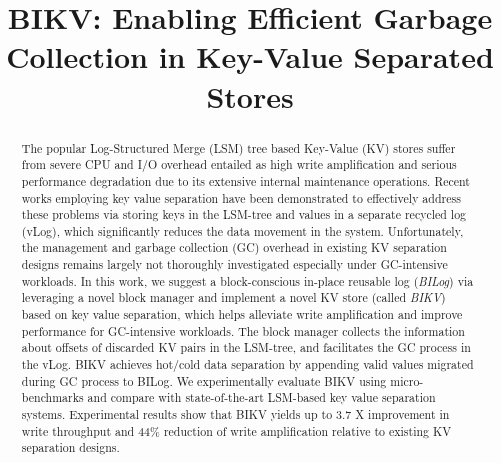 \documentclass[sigconf]{acmart}
\begin{document}
	
\title{BIKV: Enabling Efficient Garbage Collection in Key-Value Separated Stores}

\begin{abstract}
The popular Log-Structured Merge (LSM) tree based Key-Value (KV) stores suffer from severe CPU and I/O overhead entailed as high write amplification and serious performance degradation due to its extensive internal maintenance operations. Recent works employing key value separation have been demonstrated to effectively address these problems via storing keys in the LSM-tree and values in a separate recycled log (vLog), which significantly reduces the data movement in the system.  Unfortunately, the management and garbage collection (GC) overhead in existing  KV separation designs remains largely not thoroughly investigated especially under GC-intensive workloads. In this work, we suggest a block-conscious in-place reusable log ({\it{BILog}}) via leveraging a novel block manager and implement a novel KV store (called {\it{BIKV}}) based on key value separation, which helps alleviate write amplification and improve performance for GC-intensive workloads. The block manager collects the information about offsets of discarded KV pairs in the LSM-tree, {\color{black}{manages these offsets in blocks}} and facilitates the GC process in the vLog. BIKV achieves hot/cold data separation by appending valid values migrated during GC process to BILog. We experimentally evaluate BIKV using micro-benchmarks and compare with state-of-the-art LSM-based key value separation systems. Experimental results show that BIKV yields up to 3.7 X improvement in write throughput and 44\% reduction of write amplification relative to existing KV separation designs. 


\end{abstract}
\end{document}

